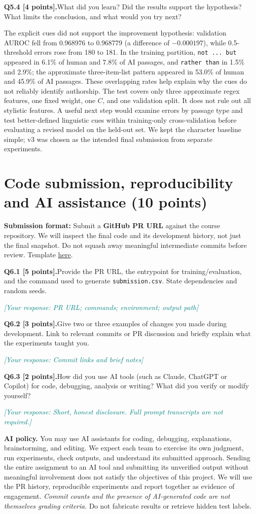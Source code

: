 \documentclass[11pt,letterpaper]{article}
\newcommand{\placeholder}[1]{\par\noindent\textcolor{teal}{\textit{[Your response: #1]}}\par\vspace{0.3em}}
\newcommand{\question}[2]{\needspace{4\baselineskip}\par\addvspace{0.45em}\noindent\textbf{#1}\quad #2\par\nobreak\vspace{0.1em}}
\begin{document}
\question{Q5.4 [4 points].}{What did you learn? Did the results support the hypothesis? What limits the conclusion, and what would you try next?}
The explicit cues did not support the improvement hypothesis: validation AUROC fell from 0.968976 to 0.968779 (a difference of $-0.000197$), while 0.5-threshold errors rose from 180 to 181. In the training partition, \texttt{not ... but} appeared in 6.1\% of human and 7.8\% of AI passages, and \texttt{rather than} in 1.5\% and 2.9\%; the approximate three-item-list pattern appeared in 53.0\% of human and 45.9\% of AI passages. These overlapping rates help explain why the cues do not reliably identify authorship. The test covers only three approximate regex features, one fixed weight, one $C$, and one validation split. It does not rule out all stylistic features. A useful next step would examine errors by passage type and test better-defined linguistic cues within training-only cross-validation before evaluating a revised model on the held-out set. We kept the character baseline simple; v3 was chosen as the intended final submission from separate experiments.
\section{Code submission, reproducibility and AI assistance (10 points)}
\textbf{Submission format:} Submit a \textbf{GitHub PR URL} against the course repository. We will inspect the final code and its development history, not just the final snapshot. Do not squash away meaningful intermediate commits before review. Template \href{https://github.com/sekhari/human-or-ai-submissions}{here}.

\question{Q6.1 [5 points].}{Provide the PR URL, the entrypoint for training/evaluation, and the command used to generate \texttt{submission.csv}. State dependencies and random seeds.}
\placeholder{PR URL; commands; environment; output path}
\question{Q6.2 [3 points].}{Give two or three examples of changes you made during development. Link to relevant commits or PR discussion and briefly explain what the experiments taught you.}
\placeholder{Commit links and brief notes}
\question{Q6.3 [2 points].}{How did you use AI tools (such as Claude, ChatGPT or Copilot) for code, debugging, analysis or writing? What did you verify or modify yourself?}
\placeholder{Short, honest disclosure. Full prompt transcripts are not required.}

\textbf{AI policy.} You may use AI assistants for coding, debugging, explanations, brainstorming, and editing. We expect each team to exercise its own judgment, run experiments, check outputs, and understand its submitted approach. Sending the entire assignment to an AI tool and submitting its unverified output without meaningful involvement does not satisfy the objectives of this project. We will use the PR history, reproducible experiments and report together as evidence of engagement. \emph{Commit counts and the presence of AI-generated code are not themselves grading criteria.} Do not fabricate results or retrieve hidden test labels.
\end{document}
